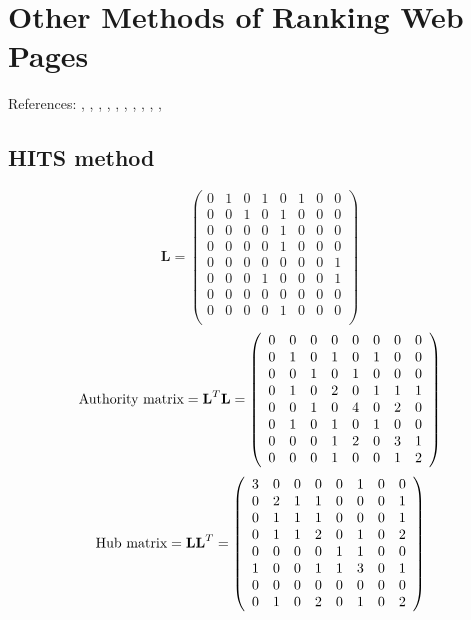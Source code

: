 \documentclass[11pt]{report}
\begin{document}
\chapter{Other Methods of Ranking Web Pages}
References: \cite{baldi2003modeling}, \cite{bharat1998improved}, \cite{bonato}, \cite{ding2003pagerank}, \cite{farahat2006authority}, \cite{kleinberg1999authoritative}, \cite{langville}, \cite{lempel2000stochastic}, \cite{manning}, \cite{ng2001link}, \cite{ng2001stable}

\section{HITS method}
\begin{equation}
\textbf{L}=\left(
\begin{array}{cccccccc}
0 & 1 & 0 & 1 & 0 & 1 & 0 & 0 \\
0 & 0 & 1 & 0 & 1 & 0 & 0 & 0 \\
0 & 0 & 0 & 0 & 1 & 0 & 0 & 0 \\
0 & 0 & 0 & 0 & 1 & 0 & 0 & 0 \\
0 & 0 & 0 & 0 & 0 & 0 & 0 & 1 \\
0 & 0 & 0 & 1 & 0 & 0 & 0 & 1 \\
0 & 0 & 0 & 0 & 0 & 0 & 0 & 0 \\
0 & 0 & 0 & 0 & 1 & 0 & 0 & 0 \\
\end{array}
\right)
\end{equation}
\begin{equation}
\textnormal{Authority matrix} = \textbf{L}^T\textbf{L}=\left(
\begin{array}{cccccccc}
0 & 0 & 0 & 0 & 0 & 0 & 0 & 0 \\
0 & 1 & 0 & 1 & 0 & 1 & 0 & 0 \\
0 & 0 & 1 & 0 & 1 & 0 & 0 & 0 \\
0 & 1 & 0 & 2 & 0 & 1 & 1 & 1 \\
0 & 0 & 1 & 0 & 4 & 0 & 2 & 0 \\
0 & 1 & 0 & 1 & 0 & 1 & 0 & 0 \\
0 & 0 & 0 & 1 & 2 & 0 & 3 & 1 \\
0 & 0 & 0 & 1 & 0 & 0 & 1 & 2 \\
\end{array}
\right)
\end{equation}
\begin{equation}
\textnormal{Hub matrix} = \textbf{LL}^T=\left(
\begin{array}{cccccccc}
3 & 0 & 0 & 0 & 0 & 1 & 0 & 0 \\
0 & 2 & 1 & 1 & 0 & 0 & 0 & 1 \\
0 & 1 & 1 & 1 & 0 & 0 & 0 & 1 \\
0 & 1 & 1 & 2 & 0 & 1 & 0 & 2 \\
0 & 0 & 0 & 0 & 1 & 1 & 0 & 0 \\
1 & 0 & 0 & 1 & 1 & 3 & 0 & 1 \\
0 & 0 & 0 & 0 & 0 & 0 & 0 & 0 \\
0 & 1 & 0 & 2 & 0 & 1 & 0 & 2 \\
\end{array}
\right)
\end{equation}
\end{document}
